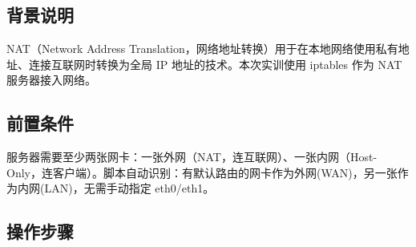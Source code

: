 \documentclass[12pt,a4paper]{ctexart}
\begin{document}
\subsection{背景说明}

NAT（Network Address Translation，网络地址转换）用于在本地网络使用私有地址、连接互联网时转换为全局 IP 地址的技术。本次实训使用 iptables 作为 NAT 服务器接入网络。

\subsection{前置条件}

服务器需要至少两张网卡：一张外网（NAT，连互联网）、一张内网（Host-Only，连客户端）。脚本自动识别：有默认路由的网卡作为外网(WAN)，另一张作为内网(LAN)，无需手动指定 eth0/eth1。

\subsection{操作步骤}
\end{document}
